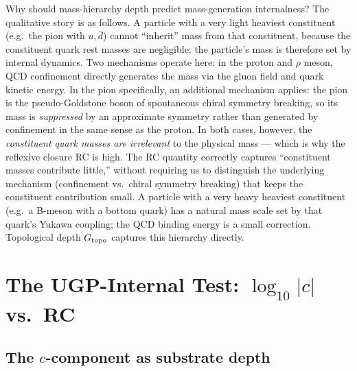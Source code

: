 \documentclass[12pt,a4paper]{article}
\begin{document}
Why should mass-hierarchy depth predict mass-generation internalness?
The qualitative story is as follows.
A particle with a very light heaviest constituent (e.g.\ the pion with
$u,\bar d$) cannot ``inherit'' mass from that constituent, because the
constituent quark rest masses are negligible; the particle's mass
is therefore set by internal dynamics.
Two mechanisms operate here: in the proton and $\rho$ meson, QCD
confinement directly generates the mass via the gluon field and quark
kinetic energy.
In the pion specifically, an additional mechanism applies: the pion is
the pseudo-Goldstone boson of spontaneous chiral symmetry breaking, so
its mass is \emph{suppressed} by an approximate symmetry rather than
generated by confinement in the same sense as the proton.
In both cases, however, the \emph{constituent quark masses are irrelevant}
to the physical mass --- which is why the reflexive closure RC is high.
The RC quantity correctly captures ``constituent masses contribute little,''
without requiring us to distinguish the underlying mechanism (confinement vs.\
chiral symmetry breaking) that keeps the constituent contribution small.
A particle with a very heavy heaviest constituent (e.g.\ a B-meson with a
bottom quark) has a natural mass scale set by that quark's Yukawa coupling;
the QCD binding energy is a small correction.
Topological depth $G_{\rm topo}$ captures this hierarchy directly.

\section{The UGP-Internal Test: $\log_{10}|c|$ vs.\ RC}
\label{sec:ugp}

\subsection{The $c$-component as substrate depth}
\end{document}
